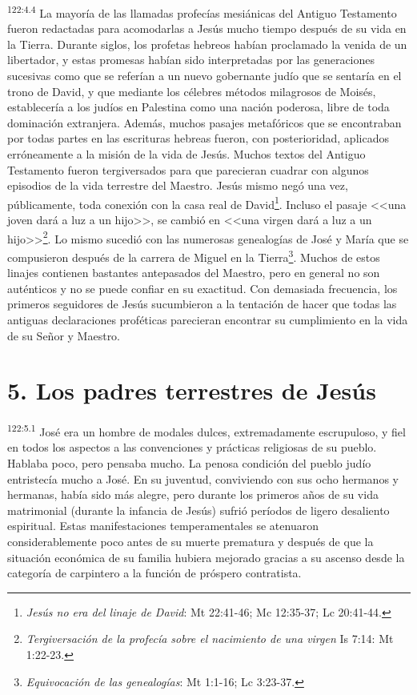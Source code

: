 \par 
\textsuperscript{122:4.4} La mayoría de las llamadas profecías mesiánicas del Antiguo Testamento fueron redactadas para acomodarlas a Jesús mucho tiempo después de su vida en la Tierra. Durante siglos, los profetas hebreos habían proclamado la venida de un libertador, y estas promesas habían sido interpretadas por las generaciones sucesivas como que se referían a un nuevo gobernante judío que se sentaría en el trono de David, y que mediante los célebres métodos milagrosos de Moisés, establecería a los judíos en Palestina como una nación poderosa, libre de toda dominación extranjera. Además, muchos pasajes metafóricos que se encontraban por todas partes en las escrituras hebreas fueron, con posterioridad, aplicados erróneamente a la misión de la vida de Jesús. Muchos textos del Antiguo Testamento fueron tergiversados para que parecieran cuadrar con algunos episodios de la vida terrestre del Maestro. Jesús mismo negó una vez, públicamente, toda conexión con la casa real de David\footnote{\textit{Jesús no era del linaje de David}: Mt 22:41-46; Mc 12:35-37; Lc 20:41-44.}. Incluso el pasaje <<una joven dará a luz a un hijo>>, se cambió en <<una virgen dará a luz a un hijo>>\footnote{\textit{Tergiversación de la profecía sobre el nacimiento de una virgen} Is 7:14: Mt 1:22-23.}. Lo mismo sucedió con las numerosas genealogías de José y María que se compusieron después de la carrera de Miguel en la Tierra\footnote{\textit{Equivocación de las genealogías}: Mt 1:1-16; Lc 3:23-37.}. Muchos de estos linajes contienen bastantes antepasados del Maestro, pero en general no son auténticos y no se puede confiar en su exactitud. Con demasiada frecuencia, los primeros seguidores de Jesús sucumbieron a la tentación de hacer que todas las antiguas declaraciones proféticas parecieran encontrar su cumplimiento en la vida de su Señor y Maestro.

\section*{5. Los padres terrestres de Jesús}
\par 
\textsuperscript{122:5.1} José era un hombre de modales dulces, extremadamente escrupuloso, y fiel en todos los aspectos a las convenciones y prácticas religiosas de su pueblo. Hablaba poco, pero pensaba mucho. La penosa condición del pueblo judío entristecía mucho a José. En su juventud, conviviendo con sus ocho hermanos y hermanas, había sido más alegre, pero durante los primeros años de su vida matrimonial
(durante la infancia de Jesús) sufrió períodos de ligero desaliento espiritual. Estas manifestaciones temperamentales se atenuaron considerablemente poco antes de su muerte prematura y después de que la situación económica de su familia hubiera mejorado gracias a su ascenso desde la categoría de carpintero a la función de próspero contratista.

